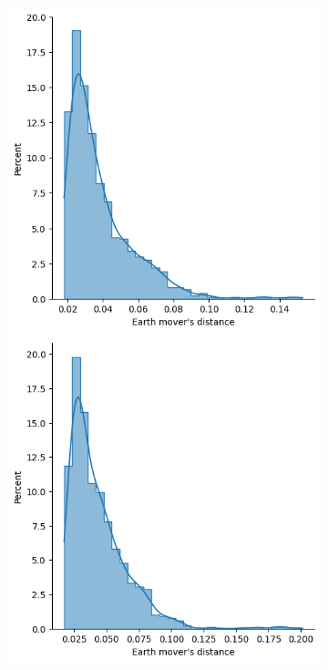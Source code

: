 \begin{figure}[htb]
\begin{subfigure}[t]{\textwidth+20pt\relax}
            \includegraphics[width=\dimexpr\linewidth-20pt\relax]{figures/ensemble/all_emds.png}
            \includegraphics[width=\dimexpr\linewidth-20pt\relax]{figures/imle/all_emds.png}

\end{subfigure}
\end{figure}
